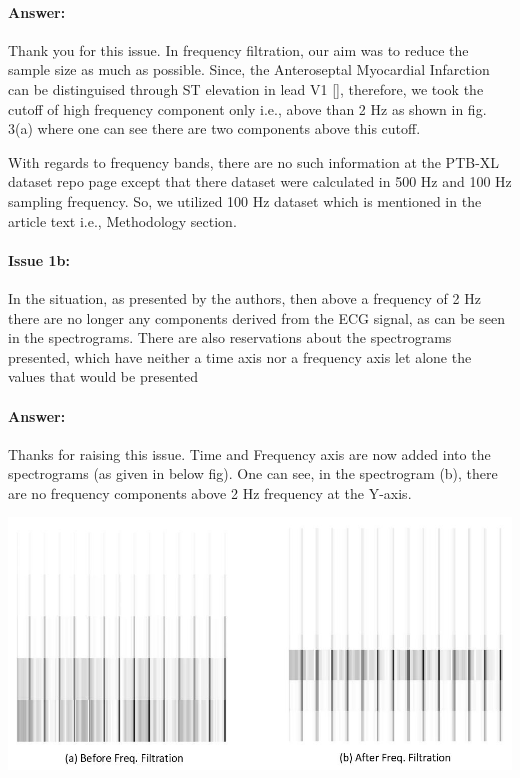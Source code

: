 \documentclass{article}
\begin{document}
\paragraph{Answer:}
Thank you for this issue. In frequency filtration, our aim was to reduce the sample size as much as possible. Since, the Anteroseptal Myocardial Infarction can be distinguised through ST elevation in lead V1 [], therefore, we took the cutoff of high frequency component only i.e., above than 2 Hz as shown in fig. 3(a) where one can see there are two components above this cutoff.

With regards to frequency bands, there are no such information at the PTB-XL dataset repo page except that there dataset were calculated in 500 Hz and 100 Hz sampling frequency. So, we utilized 100 Hz dataset which is mentioned in the article text i.e., Methodology section. 

\paragraph{Issue 1b:}
\begin{displayquote}
In the situation, as presented by the authors, then above a frequency of 2 Hz there are no longer any components derived from the ECG signal, as can be seen in the spectrograms. There are also reservations about the spectrograms presented, which have neither a time axis nor a frequency axis let alone the values that would be presented
\end{displayquote}

\paragraph{Answer:}
Thanks for raising this issue. Time and Frequency axis are now added into the spectrograms (as given in below fig). One can see, in the spectrogram (b), there are no frequency components above 2 Hz frequency at the Y-axis.

\includegraphics[scale=0.55]{before and after spectrogram.JPG}
\end{document}
